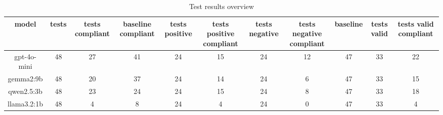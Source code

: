 
  \begin{table}[h!]
  \centering
  \begin{tabular}{|c|c|c|c|c|c|c|c|c|c|c|}
  \hline
  model & tests & tests compliant & baseline compliant & tests positive & tests positive compliant & tests negative & tests negative compliant & baseline & tests valid & tests valid compliant \\
  \hline
  gpt-4o-mini & 48 & 27 & 41 & 24 & 15 & 24 & 12 & 47 & 33 & 22\\
\hline
gemma2:9b & 48 & 20 & 37 & 24 & 14 & 24 & 6 & 47 & 33 & 15\\
\hline
qwen2.5:3b & 48 & 23 & 24 & 24 & 15 & 24 & 8 & 47 & 33 & 18\\
\hline
llama3.2:1b & 48 & 4 & 8 & 24 & 4 & 24 & 0 & 47 & 33 & 4
  \end{tabular}
  \caption{Test results overview}
  
  \end{table}
  